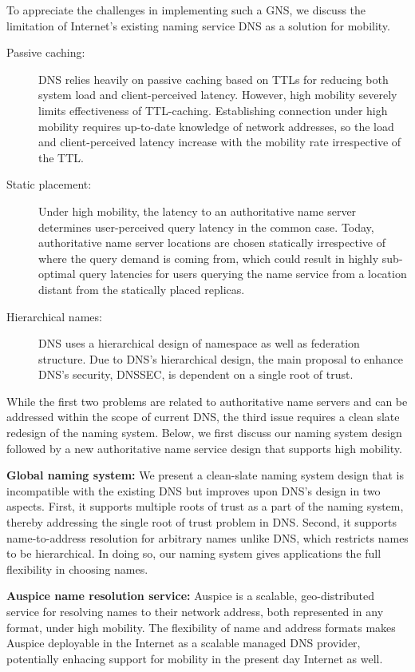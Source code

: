 To appreciate the challenges in implementing such a GNS, we discuss the limitation of Internet's existing naming service DNS as a solution for mobility.
\begin{description}
	\item[Passive caching:] 
	DNS relies heavily on passive caching based on TTLs for reducing both system load and client-perceived latency. However, high mobility severely limits effectiveness of TTL-caching. Establishing connection under high mobility requires up-to-date knowledge of network addresses, so the load and client-perceived latency increase with the mobility rate irrespective of the TTL.
	\item[Static placement:] 
	Under high mobility, the latency to an authoritative name server determines user-perceived query latency in the common case. Today, authoritative name server locations are chosen statically irrespective of where the query demand is coming from, which could result in highly sub-optimal query latencies for users querying the name service from a location distant from the statically placed replicas. 
	\item[Hierarchical names:]
	DNS uses a hierarchical design of namespace as well as federation structure. Due to DNS's hierarchical design, the main proposal to enhance DNS's security, DNSSEC, is dependent on a single root of trust. 
\end{description}

While the first two problems are related to authoritative name servers and can be addressed within the scope of current DNS, the third issue requires a clean slate redesign of the naming system. Below, we first discuss our naming system design followed by a new authoritative name service design that supports high mobility.


\textbf{Global naming system:} We present a clean-slate naming system design that is incompatible with the existing DNS but improves upon DNS's design in two aspects. First, it supports multiple roots of trust as a part of the naming system, thereby addressing the single root of trust problem in DNS. Second, it supports name-to-address resolution for arbitrary names unlike DNS, which restricts names to be hierarchical. In doing so, our naming system gives applications the full flexibility in choosing names. 

\textbf{Auspice name resolution service:} Auspice is a scalable, geo-distributed service for resolving names to their network address, both represented in any format,  under high mobility. The flexibility of name and address formats makes Auspice deployable in the Internet as a scalable managed DNS provider, potentially enhacing support for mobility in the present day Internet as well. 

